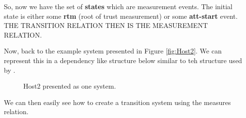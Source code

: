 \documentclass[12pt, letterpaper]{article}
\begin{document}
So, now we have the set of \textbf{states} which are measurement events. The initial state is either some \textbf{rtm} (root of trust measurement) or some \textbf{att-start} event. THE TRANSITION RELATION THEN IS THE MEASUREMENT RELATION. 

Now, back to the example system presented in Figure \ref{fig:Host2}. We can represent this in a dependency like structure below similar to teh structure used by \cite{Rowe::Bundling}. 

\begin{figure}[hbtp]
  \centering
  
  \caption{Host2 presented as one system.}
  \label{host2-block}
\end{figure}

We can then easily see how to create a transition system using the measures relation. 

\pagebreak



\end{document}
